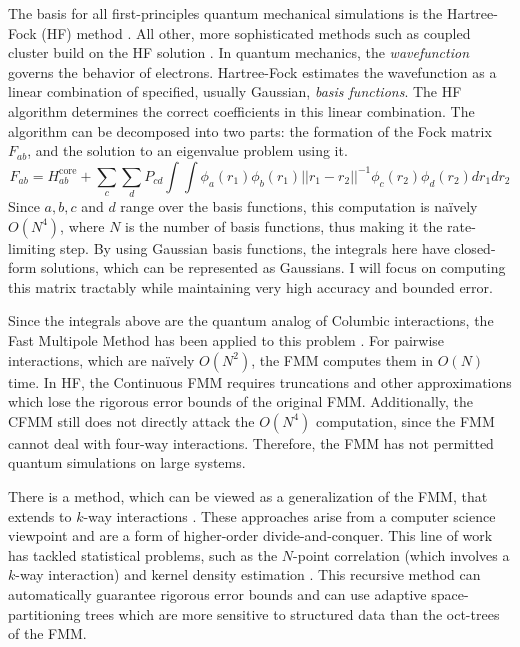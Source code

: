 \documentclass[twoside,leqno, 12pt]{article}
\begin{document}
The basis for all first-principles quantum mechanical simulations is the Hartree-Fock (HF) method \cite{RevModPhys.23.69}.  All other, more sophisticated methods such as coupled cluster build on the HF solution \cite{cc}.  In quantum mechanics, the \emph{wavefunction} governs the behavior of electrons.  Hartree-Fock estimates the wavefunction as a linear combination of specified, usually Gaussian, \emph{basis functions}.  The HF algorithm determines the correct coefficients in this linear combination.  The algorithm can be decomposed into two parts: the formation of the Fock matrix $F_{a b}$, and the solution to an eigenvalue problem using it.  
\begin{displaymath}
F_{a b} = H^{\textrm{core}}_{a b} + \sum_c \sum_d P_{c d} \int \int \phi_a(r_1) \phi_b(r_1) ||r_1 - r_2||^{-1} \phi_c(r_2) \phi_d(r_2) dr_1 dr_2
\end{displaymath}
Since $a, b, c$ and $d$ range over the basis functions, this computation is na\"{i}vely $O(N^4)$, where $N$ is the number of basis functions, thus making it the rate-limiting step.  By using Gaussian basis functions, the integrals here have closed-form solutions, which can be represented as Gaussians.  I will focus on computing this matrix tractably while maintaining very high accuracy and bounded error.


Since the integrals above are the quantum analog of Columbic interactions, the Fast Multipole Method has been applied to this problem \cite{grngard}.  For pairwise interactions, which are na\"{i}vely $O(N^2)$, the FMM computes them in $O(N)$ time.  In HF, the Continuous FMM \cite{white_continuous} requires truncations and other approximations which lose the rigorous error bounds of the original FMM.  Additionally, the CFMM still does not directly attack the $O(N^4)$ computation, since the FMM cannot deal with four-way interactions.  Therefore, the FMM has not permitted quantum simulations on large systems. 


There is a method, which can be viewed as a generalization of the FMM, that extends to $k$-way interactions \cite{gray_nbody, techrep}.  These approaches arise from a computer science viewpoint and are a form of higher-order divide-and-conquer.  This line of work has tackled statistical problems, such as the $N$-point correlation (which involves a $k$-way interaction) \cite{comp.phys94} and kernel density estimation \cite{NIPS2005_570}.  This recursive method can automatically guarantee rigorous error bounds and can use adaptive space-partitioning trees which are more sensitive to structured data than the oct-trees of the FMM.  
\end{document}
